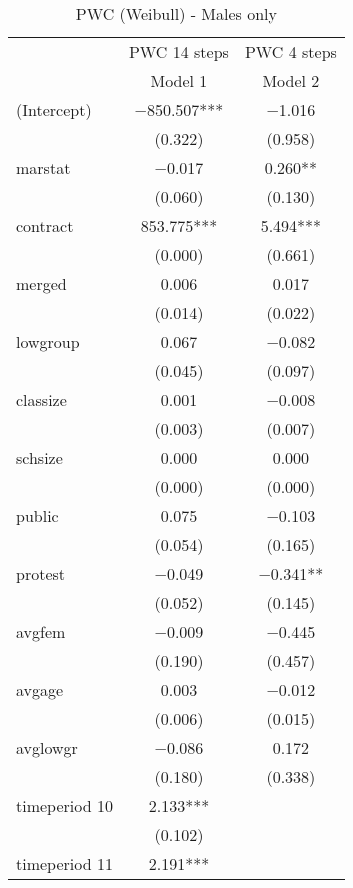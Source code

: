 \documentclass[
]{article}
\begin{document}
\begin{table}[!h]

\caption{\label{tab:unnamed-chunk-19}PWC (Weibull) - Males only}
\centering
\fontsize{8}{10}\selectfont
\begin{tabular}[t]{lcc}
\toprule
\multicolumn{1}{c}{ } & \multicolumn{1}{c}{PWC 14 steps} & \multicolumn{1}{c}{PWC 4 steps} \\
\cmidrule(l{3pt}r{3pt}){2-2} \cmidrule(l{3pt}r{3pt}){3-3}
  & Model 1 & Model 2\\
\midrule
(Intercept) & \num{-850.507}*** & \num{-1.016}\\
 & (\num{0.322}) & (\num{0.958})\\
marstat & \num{-0.017} & \num{0.260}**\\
 & (\num{0.060}) & (\num{0.130})\\
contract & \num{853.775}*** & \num{5.494}***\\
 & (\num{0.000}) & (\num{0.661})\\
merged & \num{0.006} & \num{0.017}\\
 & (\num{0.014}) & (\num{0.022})\\
lowgroup & \num{0.067} & \num{-0.082}\\
 & (\num{0.045}) & (\num{0.097})\\
classize & \num{0.001} & \num{-0.008}\\
 & (\num{0.003}) & (\num{0.007})\\
schsize & \num{0.000} & \num{0.000}\\
 & (\num{0.000}) & (\num{0.000})\\
public & \num{0.075} & \num{-0.103}\\
 & (\num{0.054}) & (\num{0.165})\\
protest & \num{-0.049} & \num{-0.341}**\\
 & (\num{0.052}) & (\num{0.145})\\
avgfem & \num{-0.009} & \num{-0.445}\\
 & (\num{0.190}) & (\num{0.457})\\
avgage & \num{0.003} & \num{-0.012}\\
 & (\num{0.006}) & (\num{0.015})\\
avglowgr & \num{-0.086} & \num{0.172}\\
 & (\num{0.180}) & (\num{0.338})\\
timeperiod 10 & \num{2.133}*** & \\
 & (\num{0.102}) & \\
timeperiod 11 & \num{2.191}*** & \\

\end{tabular}
\end{table}
\end{document}
